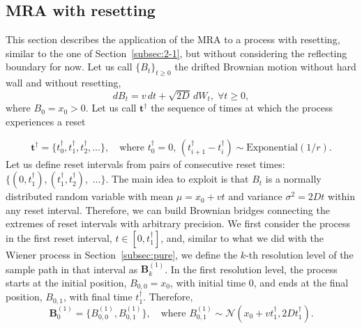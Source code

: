 \documentclass[preprint,12pt]{elsarticle}
\numberwithin{equation}{section}
\theoremstyle{plain} \newtheorem{theorem}{Theorem}[section]
\theoremstyle{plain} \newtheorem{proposition}[theorem]{Proposition}
\theoremstyle{plain} \newtheorem{lemma}[theorem]{Lemma}
\theoremstyle{plain} \newtheorem{corollary}[theorem]{Corollary}
\theoremstyle{definition} \newtheorem{definition}[theorem]{Definition}
\theoremstyle{definition} \newtheorem{notation}[theorem]{Notation}
\theoremstyle{remark} \newtheorem{remark}[theorem]{Remark}
\theoremstyle{remark} \newtheorem{remarks}[theorem]{Remarks}
\theoremstyle{remark} \newtheorem{algorithm2}[theorem]{Algorithm}
\theoremstyle{remark} \newtheorem{example}[theorem]{Example}
\begin{document}
\subsection{MRA with resetting} \label{subsubsec:4-1-2}

This section describes the application of the MRA to a process with resetting, similar to the one of Section~\ref{subsec:2-1}, but without considering the reflecting boundary for now. Let us call $\{B_t\}_{t \ge 0}$ 
the drifted Brownian motion without hard wall and without resetting,
\begin{equation}\label{eq:unbounded_Br}
	dB_t= v\,dt+\sqrt{2D}\,dW_t, \; \forall t \ge 0,
\end{equation}
where $B_0 = x_0>0$. Let us call $\mathbf{t^\dag}$ the sequence of times at which the process experiences a reset

\begin{equation*}
    \mathbf{t^\dag} = \{t_0^\dag, t_1^\dag, t_2^\dag, \ldots\}, \quad \text{where } t_0^\dag=0, \, (t^\dag_{i+1}-t^\dag_i) \sim \text{Exponential}(1/r).
\end{equation*}
Let us define reset intervals from pairs of consecutive reset times: $\{(0, t^\dag_1), (t^\dag_1, t^\dag_2),$ 
$ \ldots \}$. The main idea to exploit is that  $B_{t}$ is a normally distributed random variable with mean $\mu = x_0+vt$ and variance $\sigma^2 = 2Dt$ within any reset interval. Therefore, we can build Brownian bridges connecting the extremes of reset intervals with arbitrary precision. We first consider the process in the first reset interval, $t\in[0,t^\dag_1]$, and, similar to what we did with the Wiener process in Section~\ref{subsec:pure}, we define the $k$-th resolution level of the sample path in that interval as $\mathbf{B}^{(1)}_k$. In the first resolution level, the process starts at the initial position, $B_{0,0} = x_0$, with initial time $0$, and ends at the final position, $B_{0,1}$, with final time $t^\dag_1$. Therefore, 
\begin{equation}
\mathbf{B}_0^{(1)} = \{B^{(1)}_{0,0} , B^{(1)}_{0,1}\}, \quad \text{where } B^{(1)}_{0,1} \sim \mathcal{N}(x_0+vt^\dag_1,
2Dt_1^\dag).
\label{eq:x00}
\end{equation}
\end{document}
